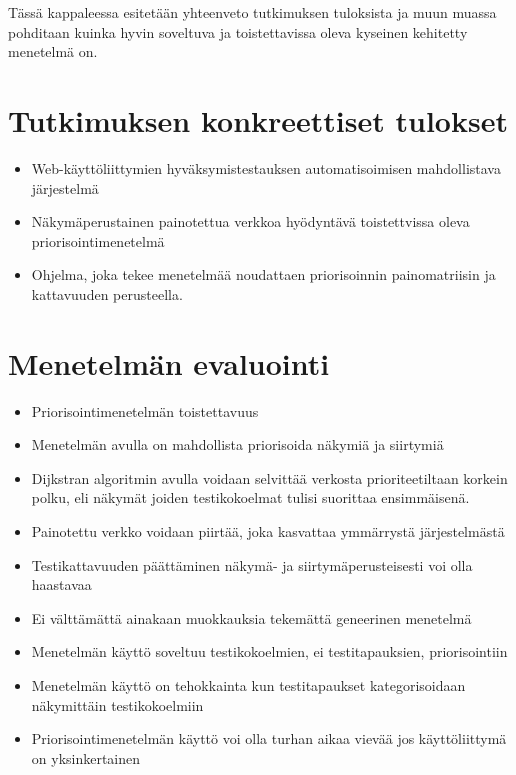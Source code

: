 Tässä kappaleessa esitetään yhteenveto tutkimuksen tuloksista ja muun muassa pohditaan kuinka hyvin soveltuva ja toistettavissa oleva kyseinen kehitetty menetelmä on.

\section{Tutkimuksen konkreettiset tulokset} \label{ch:12_tutkimuksen_konkreettiset_tulokset}

  \begin{itemize}
    \item Web-käyttöliittymien hyväksymistestauksen automatisoimisen mahdollistava järjestelmä
    \item Näkymäperustainen painotettua verkkoa hyödyntävä toistettvissa oleva priorisointimenetelmä
    \item Ohjelma, joka tekee menetelmää noudattaen priorisoinnin painomatriisin ja kattavuuden perusteella.
  \end{itemize}

\section{Menetelmän evaluointi} \label{ch:12_menetelman_evaluointi}

  \begin{itemize}
    \item Priorisointimenetelmän toistettavuus
    \item Menetelmän avulla on mahdollista priorisoida näkymiä ja siirtymiä
    \item Dijkstran algoritmin avulla voidaan selvittää verkosta prioriteetiltaan korkein polku, eli näkymät joiden testikokoelmat tulisi suorittaa ensimmäisenä.
    \item Painotettu verkko voidaan piirtää, joka kasvattaa ymmärrystä järjestelmästä
    \item Testikattavuuden päättäminen näkymä- ja siirtymäperusteisesti voi olla haastavaa
    \item Ei välttämättä ainakaan muokkauksia tekemättä geneerinen menetelmä
    \item Menetelmän käyttö soveltuu testikokoelmien, ei testitapauksien, priorisointiin
    \item Menetelmän käyttö on tehokkainta kun testitapaukset kategorisoidaan näkymittäin testikokoelmiin
    \item Priorisointimenetelmän käyttö voi olla turhan aikaa vievää jos käyttöliittymä on yksinkertainen
  \end{itemize}

